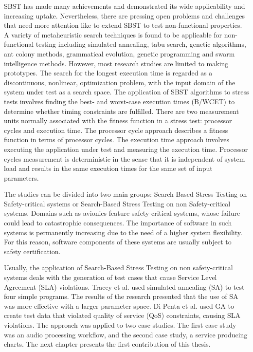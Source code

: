 \documentclass[espaco=umemeio,chapter=TITLE,twoside,openright]{abnt}
\begin{document}
SBST has made many achievements and demonstrated its wide applicability and increasing uptake. Nevertheless, there are pressing open problems and challenges that need more attention like to extend SBST to test non-functional properties. A variety of metaheuristic search techniques is found to be applicable for non-functional testing including simulated annealing, tabu search, genetic algorithms, ant colony methods, grammatical evolution, genetic programming and swarm intelligence methods. However, most research studies are limited to making prototypes. The search for the longest execution time is regarded as a discontinuous, nonlinear, optimization problem, with the input domain of the system under test as a search space.  The application of SBST algorithms to  stress tests involves finding the best- and worst-case execution times (B/WCET) to determine whether timing constraints are fulfilled. There are two measurement units normally associated with the fitness function in a stress test: processor cycles and execution time. The processor cycle approach describes a fitness function in terms of processor cycles. The execution time approach involves executing the application under test and measuring the execution time. Processor cycles measurement is deterministic in the sense that it is independent of system load and results in the same execution times for the same set of input parameters.

The studies can be divided into two main groups: Search-Based Stress Testing on Safety-critical systems or Search-Based Stress Testing on non Safety-critical systems. Domains such as avionics feature safety-critical systems, whose failure could lead to catastrophic consequences.  The importance of software in such systems is permanently increasing due to the need of a higher system
flexibility. For this reason, software components of these systems are usually subject to safety certification. 

Usually, the application of Search-Based Stress Testing on non safety-critical systems deals with the generation of test cases that cause Service Level Agreement (SLA) violations. Tracey et al.  used simulated annealing (SA) to test four
simple programs. The results of the research presented that the use of SA was more effective with a larger parameter space. Di Penta et al. used GA to create test data that violated quality of service (QoS) constraints, causing SLA violations. The approach was applied to two case studies. The first case study was an audio processing workflow, and the second case study, a service producing charts. The next chapter presents the first contribution of this thesis.
\end{document}
